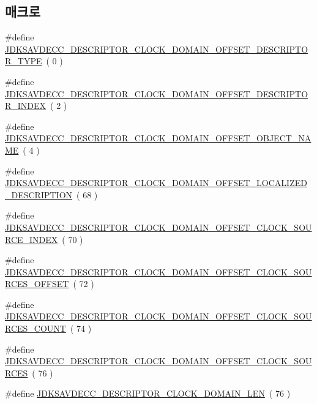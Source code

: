 \subsection*{매크로}
\begin{DoxyCompactItemize}
\item 
\#define \hyperlink{group__descriptor__clock__domain_ga410c66011a9dc08e604939bcb6c61fdf}{J\+D\+K\+S\+A\+V\+D\+E\+C\+C\+\_\+\+D\+E\+S\+C\+R\+I\+P\+T\+O\+R\+\_\+\+C\+L\+O\+C\+K\+\_\+\+D\+O\+M\+A\+I\+N\+\_\+\+O\+F\+F\+S\+E\+T\+\_\+\+D\+E\+S\+C\+R\+I\+P\+T\+O\+R\+\_\+\+T\+Y\+PE}~( 0 )
\item 
\#define \hyperlink{group__descriptor__clock__domain_ga2462ebc1af068c9c064e539586ae6bc5}{J\+D\+K\+S\+A\+V\+D\+E\+C\+C\+\_\+\+D\+E\+S\+C\+R\+I\+P\+T\+O\+R\+\_\+\+C\+L\+O\+C\+K\+\_\+\+D\+O\+M\+A\+I\+N\+\_\+\+O\+F\+F\+S\+E\+T\+\_\+\+D\+E\+S\+C\+R\+I\+P\+T\+O\+R\+\_\+\+I\+N\+D\+EX}~( 2 )
\item 
\#define \hyperlink{group__descriptor__clock__domain_ga0c326f6fe29857934351c5170063b60c}{J\+D\+K\+S\+A\+V\+D\+E\+C\+C\+\_\+\+D\+E\+S\+C\+R\+I\+P\+T\+O\+R\+\_\+\+C\+L\+O\+C\+K\+\_\+\+D\+O\+M\+A\+I\+N\+\_\+\+O\+F\+F\+S\+E\+T\+\_\+\+O\+B\+J\+E\+C\+T\+\_\+\+N\+A\+ME}~( 4 )
\item 
\#define \hyperlink{group__descriptor__clock__domain_gaa4ace80caba01e00229d4cfb3fd54952}{J\+D\+K\+S\+A\+V\+D\+E\+C\+C\+\_\+\+D\+E\+S\+C\+R\+I\+P\+T\+O\+R\+\_\+\+C\+L\+O\+C\+K\+\_\+\+D\+O\+M\+A\+I\+N\+\_\+\+O\+F\+F\+S\+E\+T\+\_\+\+L\+O\+C\+A\+L\+I\+Z\+E\+D\+\_\+\+D\+E\+S\+C\+R\+I\+P\+T\+I\+ON}~( 68 )
\item 
\#define \hyperlink{group__descriptor__clock__domain_ga87ccb2a813c16fd3fd527f0ad1005611}{J\+D\+K\+S\+A\+V\+D\+E\+C\+C\+\_\+\+D\+E\+S\+C\+R\+I\+P\+T\+O\+R\+\_\+\+C\+L\+O\+C\+K\+\_\+\+D\+O\+M\+A\+I\+N\+\_\+\+O\+F\+F\+S\+E\+T\+\_\+\+C\+L\+O\+C\+K\+\_\+\+S\+O\+U\+R\+C\+E\+\_\+\+I\+N\+D\+EX}~( 70 )
\item 
\#define \hyperlink{group__descriptor__clock__domain_ga81aba69bbcec4b92f3676b2f873db3ba}{J\+D\+K\+S\+A\+V\+D\+E\+C\+C\+\_\+\+D\+E\+S\+C\+R\+I\+P\+T\+O\+R\+\_\+\+C\+L\+O\+C\+K\+\_\+\+D\+O\+M\+A\+I\+N\+\_\+\+O\+F\+F\+S\+E\+T\+\_\+\+C\+L\+O\+C\+K\+\_\+\+S\+O\+U\+R\+C\+E\+S\+\_\+\+O\+F\+F\+S\+ET}~( 72 )
\item 
\#define \hyperlink{group__descriptor__clock__domain_ga0f71f1949f2f971bfd6957e334ff5bee}{J\+D\+K\+S\+A\+V\+D\+E\+C\+C\+\_\+\+D\+E\+S\+C\+R\+I\+P\+T\+O\+R\+\_\+\+C\+L\+O\+C\+K\+\_\+\+D\+O\+M\+A\+I\+N\+\_\+\+O\+F\+F\+S\+E\+T\+\_\+\+C\+L\+O\+C\+K\+\_\+\+S\+O\+U\+R\+C\+E\+S\+\_\+\+C\+O\+U\+NT}~( 74 )
\item 
\#define \hyperlink{group__descriptor__clock__domain_gab0430add395d79eb343270cb8720be11}{J\+D\+K\+S\+A\+V\+D\+E\+C\+C\+\_\+\+D\+E\+S\+C\+R\+I\+P\+T\+O\+R\+\_\+\+C\+L\+O\+C\+K\+\_\+\+D\+O\+M\+A\+I\+N\+\_\+\+O\+F\+F\+S\+E\+T\+\_\+\+C\+L\+O\+C\+K\+\_\+\+S\+O\+U\+R\+C\+ES}~( 76 )
\item 
\#define \hyperlink{group__descriptor__clock__domain_gab5413d6a262da98f3cc096cac6d47590}{J\+D\+K\+S\+A\+V\+D\+E\+C\+C\+\_\+\+D\+E\+S\+C\+R\+I\+P\+T\+O\+R\+\_\+\+C\+L\+O\+C\+K\+\_\+\+D\+O\+M\+A\+I\+N\+\_\+\+L\+EN}~( 76 )
\end{DoxyCompactItemize}
